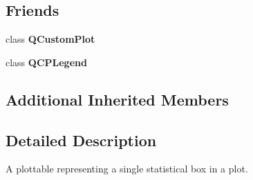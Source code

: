 \subsection*{Friends}
\begin{DoxyCompactItemize}
\item 
\mbox{\label{class_q_c_p_statistical_box_a1cdf9df76adcfae45261690aa0ca2198}} 
class {\bfseries Q\+Custom\+Plot}
\item 
\mbox{\label{class_q_c_p_statistical_box_a8429035e7adfbd7f05805a6530ad5e3b}} 
class {\bfseries Q\+C\+P\+Legend}
\end{DoxyCompactItemize}
\subsection*{Additional Inherited Members}


\subsection{Detailed Description}
A plottable representing a single statistical box in a plot. 



